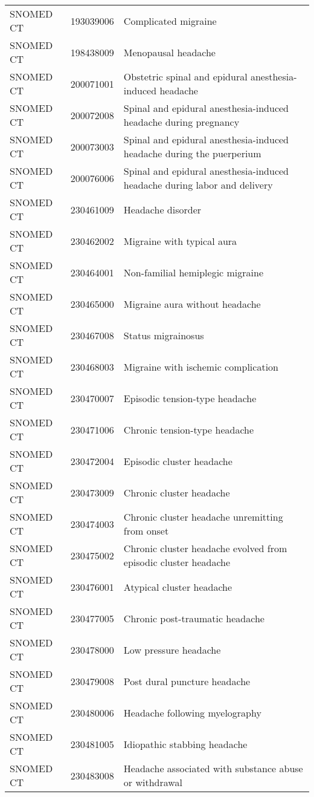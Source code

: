 \begin{longtable}{p{}p{}p{}}
  SNOMED CT & 193039006 & Complicated migraine \\ 
  SNOMED CT & 198438009 & Menopausal headache \\ 
  SNOMED CT & 200071001 & Obstetric spinal and epidural anesthesia-induced headache \\ 
  SNOMED CT & 200072008 & Spinal and epidural anesthesia-induced headache during pregnancy \\ 
  SNOMED CT & 200073003 & Spinal and epidural anesthesia-induced headache during the puerperium \\ 
  SNOMED CT & 200076006 & Spinal and epidural anesthesia-induced headache during labor and delivery \\ 
  SNOMED CT & 230461009 & Headache disorder \\ 
  SNOMED CT & 230462002 & Migraine with typical aura \\ 
  SNOMED CT & 230464001 & Non-familial hemiplegic migraine \\ 
  SNOMED CT & 230465000 & Migraine aura without headache \\ 
  SNOMED CT & 230467008 & Status migrainosus \\ 
  SNOMED CT & 230468003 & Migraine with ischemic complication \\ 
  SNOMED CT & 230470007 & Episodic tension-type headache \\ 
  SNOMED CT & 230471006 & Chronic tension-type headache \\ 
  SNOMED CT & 230472004 & Episodic cluster headache \\ 
  SNOMED CT & 230473009 & Chronic cluster headache \\ 
  SNOMED CT & 230474003 & Chronic cluster headache unremitting from onset \\ 
  SNOMED CT & 230475002 & Chronic cluster headache evolved from episodic cluster headache \\ 
  SNOMED CT & 230476001 & Atypical cluster headache \\ 
  SNOMED CT & 230477005 & Chronic post-traumatic headache \\ 
  SNOMED CT & 230478000 & Low pressure headache \\ 
  SNOMED CT & 230479008 & Post dural puncture headache \\ 
  SNOMED CT & 230480006 & Headache following myelography \\ 
  SNOMED CT & 230481005 & Idiopathic stabbing headache \\ 
  SNOMED CT & 230483008 & Headache associated with substance abuse or withdrawal \\ 

\end{longtable}
